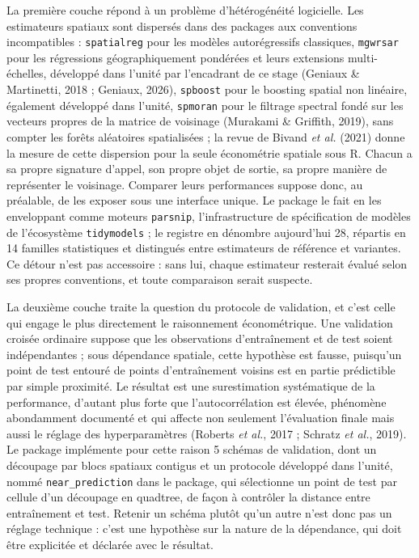\documentclass[11pt,a4paper]{article}
\begin{document}
La première couche répond à un problème d'hétérogénéité logicielle. Les estimateurs spatiaux sont dispersés dans des packages aux conventions incompatibles : \texttt{spatialreg} pour les modèles autorégressifs classiques, \texttt{mgwrsar} pour les régressions géographiquement pondérées et leurs extensions multi-échelles, développé dans l'unité par l'encadrant de ce stage (Geniaux \& Martinetti, 2018 ; Geniaux, 2026), \texttt{spboost} pour le boosting spatial non linéaire, également développé dans l'unité, \texttt{spmoran} pour le filtrage spectral fondé sur les vecteurs propres de la matrice de voisinage (Murakami \& Griffith, 2019), sans compter les forêts aléatoires spatialisées ; la revue de Bivand \textit{et al.} (2021) donne la mesure de cette dispersion pour la seule économétrie spatiale sous R. Chacun a sa propre signature d'appel, son propre objet de sortie, sa propre manière de représenter le voisinage. Comparer leurs performances suppose donc, au préalable, de les exposer sous une interface unique. Le package le fait en les enveloppant comme moteurs \texttt{parsnip}, l'infrastructure de spécification de modèles de l'écosystème \texttt{tidymodels} ; le registre en dénombre aujourd'hui 28, répartis en 14 familles statistiques et distingués entre estimateurs de référence et variantes. Ce détour n'est pas accessoire : sans lui, chaque estimateur resterait évalué selon ses propres conventions, et toute comparaison serait suspecte.

La deuxième couche traite la question du protocole de validation, et c'est celle qui engage le plus directement le raisonnement économétrique. Une validation croisée ordinaire suppose que les observations d'entraînement et de test soient indépendantes ; sous dépendance spatiale, cette hypothèse est fausse, puisqu'un point de test entouré de points d'entraînement voisins est en partie prédictible par simple proximité. Le résultat est une surestimation systématique de la performance, d'autant plus forte que l'autocorrélation est élevée, phénomène abondamment documenté et qui affecte non seulement l'évaluation finale mais aussi le réglage des hyperparamètres (Roberts \textit{et al.}, 2017 ; Schratz \textit{et al.}, 2019). Le package implémente pour cette raison 5 schémas de validation, dont un découpage par blocs spatiaux contigus et un protocole développé dans l'unité, nommé \texttt{near\_prediction} dans le package, qui sélectionne un point de test par cellule d'un découpage en quadtree, de façon à contrôler la distance entre entraînement et test. Retenir un schéma plutôt qu'un autre n'est donc pas un réglage technique : c'est une hypothèse sur la nature de la dépendance, qui doit être explicitée et déclarée avec le résultat.
\end{document}

